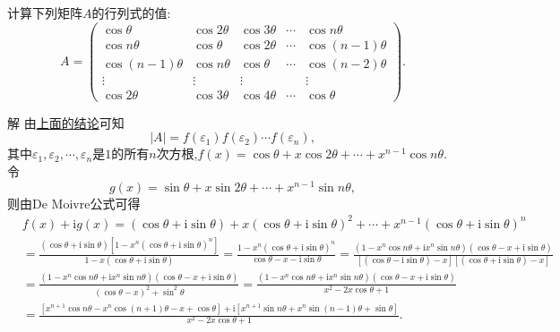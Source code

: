 \documentclass[../../main.tex]{subfiles}%
\begin{document}
\begin{example}
计算下列矩阵\(A\)的行列式的值:
\[
A = 
\begin{pmatrix}
\cos\theta & \cos2\theta & \cos3\theta & \cdots & \cos n\theta\\
\cos n\theta & \cos\theta & \cos2\theta & \cdots & \cos(n - 1)\theta\\
\cos(n - 1)\theta & \cos n\theta & \cos\theta & \cdots & \cos(n - 2)\theta\\
\vdots & \vdots & \vdots & & \vdots\\
\cos2\theta & \cos3\theta & \cos4\theta & \cdots & \cos\theta
\end{pmatrix}.
\]
\end{example}
\begin{solution}

解 由\hyperref[proposition:循环行列式计算公式]{上面的结论}可知
\[
|A| = f(\varepsilon_1)f(\varepsilon_2)\cdots f(\varepsilon_n),
\]
其中\(\varepsilon_1,\varepsilon_2,\cdots,\varepsilon_n\)是\(1\)的所有\(n\)次方根,\(f(x)=\cos\theta + x\cos2\theta+\cdots+x^{n - 1}\cos n\theta\).令
\[
g(x)=\sin\theta + x\sin2\theta+\cdots+x^{n - 1}\sin n\theta,
\]
则由De Moivre公式可得
\begin{align*}
&f(x)+\mathrm{i}g(x)=\left( \cos \theta +\mathrm{i}\sin \theta \right) +x\left( \cos \theta +\mathrm{i}\sin \theta \right) ^2+\cdots +x^{n-1}\left( \cos \theta +\mathrm{i}\sin \theta \right) ^n
\\
&=\frac{\left( \cos \theta +\mathrm{i}\sin \theta \right) \left[ 1-x^n\left( \cos \theta +\mathrm{i}\sin \theta \right) ^n \right]}{1-x\left( \cos \theta +\mathrm{i}\sin \theta \right)}=\frac{1-x^n\left( \cos \theta +\mathrm{i}\sin \theta \right) ^n}{\cos \theta -x-\mathrm{i}\sin \theta}=\frac{\left( 1-x^n\cos n\theta +\mathrm{i}x^n\sin n\theta \right) \left( \cos \theta -x+\mathrm{i}\sin \theta \right)}{\left[ \left( \cos \theta -\mathrm{i}\sin \theta \right) -x \right] \left[ \left( \cos \theta +\mathrm{i}\sin \theta \right) -x \right]}
\\
&=\frac{\left( 1-x^n\cos n\theta +\mathrm{i}x^n\sin n\theta \right) \left( \cos \theta -x+\mathrm{i}\sin \theta \right)}{\left( \cos \theta -x \right) ^2+\sin ^2\theta}=\frac{\left( 1-x^n\cos n\theta +\mathrm{i}x^n\sin n\theta \right) \left( \cos \theta -x+\mathrm{i}\sin \theta \right)}{x^2-2x\cos \theta +1}
\\
&=\frac{\left[ x^{n+1}\cos n\theta -x^n\cos \left( n+1 \right) \theta -x+\cos \theta \right] +\mathrm{i}\left[ x^{n+1}\sin n\theta +x^n\sin \left( n-1 \right) \theta +\sin \theta \right]}{x^2-2x\cos \theta +1}.

\end{align*}
\end{solution}
\end{document}
